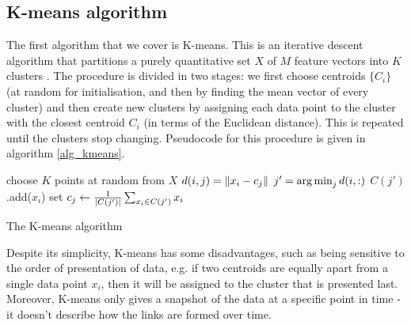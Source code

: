 \documentclass[../main.tex]{subfiles} \label{chapter_soa}
\begin{document}
\subsection{K-means algorithm} \label{subsection_kmeans}
The first algorithm that we cover is K-means. This is an iterative descent algorithm that partitions a purely quantitative set $X$ of $M$ feature vectors into $K$ clusters \cite{hastie2008}. The procedure is divided in two stages: we first choose centroids $\{C_i\}$ (at random for initialisation, and then by finding the mean vector of every cluster) and then create new clusters by assigning each data point to the cluster with the closest centroid $C_i$ (in terms of the Euclidean distance). This is repeated until the clusters stop changing. Pseudocode for this procedure is given in algorithm \ref{alg_kmeans}.
\begin{algorithm}
\begin{algorithmic}[1]
\State choose $K$ points at random from $X$
\Repeat
{}
        \State $d(i,j) = \left\lVert x_i - c_j\right\rVert$
    \EndFor  
    \State $j' = \operatorname*{arg\,min}_j{d(i, :)}$
    \State $C(j')$.add($x_i$)
\EndFor
{}
    \State set $c_j \gets \frac{1}{\lvert C(j')\rvert}\sum_{x_i \in C(j')}{x_i}$
\EndFor  
{}
\EndFunction
\caption{The K-means algorithm}\label{alg_kmeans}
\end{algorithmic}
\end{algorithm}
\par Despite its simplicity, K-means has some disadvantages, such as being sensitive to the order of presentation of data, e.g. if two centroids are equally apart from a single data point $x_i$, then it will be assigned to the cluster that is presented last. Moreover, K-means only gives a snapshot of the data at a specific point in time - it doesn't describe how the links are formed over time. 
\end{document}
